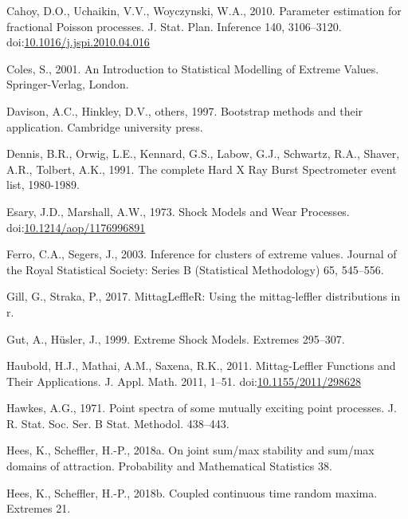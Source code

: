 \documentclass[]{elsarticle} %
\begin{document}
\leavevmode\hypertarget{ref-Cahoy2010}{}%
Cahoy, D.O., Uchaikin, V.V., Woyczynski, W.A., 2010. Parameter
estimation for fractional Poisson processes. J. Stat. Plan. Inference
140, 3106--3120.
doi:\href{https://doi.org/10.1016/j.jspi.2010.04.016}{10.1016/j.jspi.2010.04.016}

\leavevmode\hypertarget{ref-ColesBook}{}%
Coles, S., 2001. An Introduction to Statistical Modelling of Extreme
Values. Springer-Verlag, London.

\leavevmode\hypertarget{ref-davison1997bootstrap}{}%
Davison, A.C., Hinkley, D.V., others, 1997. Bootstrap methods and their
application. Cambridge university press.

\leavevmode\hypertarget{ref-HXRBS}{}%
Dennis, B.R., Orwig, L.E., Kennard, G.S., Labow, G.J., Schwartz, R.A.,
Shaver, A.R., Tolbert, A.K., 1991. The complete Hard X Ray Burst
Spectrometer event list, 1980-1989.

\leavevmode\hypertarget{ref-Esary1973}{}%
Esary, J.D., Marshall, A.W., 1973. Shock Models and Wear Processes.
doi:\href{https://doi.org/10.1214/aop/1176996891}{10.1214/aop/1176996891}

\leavevmode\hypertarget{ref-ferro2003inference}{}%
Ferro, C.A., Segers, J., 2003. Inference for clusters of extreme values.
Journal of the Royal Statistical Society: Series B (Statistical
Methodology) 65, 545--556.

\leavevmode\hypertarget{ref-MittagLeffleR}{}%
Gill, G., Straka, P., 2017. MittagLeffleR: Using the mittag-leffler
distributions in r.

\leavevmode\hypertarget{ref-Gut1999}{}%
Gut, A., Hüsler, J., 1999. Extreme Shock Models. Extremes 295--307.

\leavevmode\hypertarget{ref-Haubold11}{}%
Haubold, H.J., Mathai, A.M., Saxena, R.K., 2011. Mittag-Leffler
Functions and Their Applications. J. Appl. Math. 2011, 1--51.
doi:\href{https://doi.org/10.1155/2011/298628}{10.1155/2011/298628}

\leavevmode\hypertarget{ref-hawkes1971point}{}%
Hawkes, A.G., 1971. Point spectra of some mutually exciting point
processes. J. R. Stat. Soc. Ser. B Stat. Methodol. 438--443.

\leavevmode\hypertarget{ref-hees2016joint}{}%
Hees, K., Scheffler, H.-P., 2018a. On joint sum/max stability and
sum/max domains of attraction. Probability and Mathematical Statistics
38.

\leavevmode\hypertarget{ref-hees2017coupled}{}%
Hees, K., Scheffler, H.-P., 2018b. Coupled continuous time random
maxima. Extremes 21.
\end{document}
